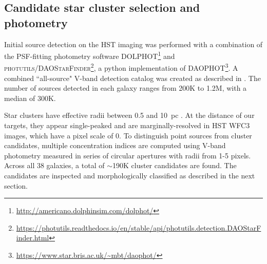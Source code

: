 \documentclass[linenumbers]{aastex63}
\begin{document}
\subsection{Candidate star cluster selection and photometry}\label{ssect:select_photo}

Initial source detection \citep{thilker_phangs-hst_2022} on the HST imaging was performed with a combination of the PSF-fitting photometry software \textsc{DOLPHOT}\footnote{\url{http://americano.dolphinsim.com/dolphot/}} \citep[v2.0,][]{dolphin_dolphot_2016} and \textsc{photutils/DAOStarFinder}\footnote{\url{https://photutils.readthedocs.io/en/stable/api/photutils.detection.DAOStarFinder.html}}\citep[][]{bradley_astropyphotutils_2023}, a python implementation of \textsc{DAOPHOT}\footnote{\url{https://www.star.bris.ac.uk/~mbt/daophot/}}\citep[v1.3-2][]{stetson_daophot_1987}. A combined ``all-source" V-band detection catalog was created as described in \citet{thilker_phangs-hst_2022}. The number of sources detected in each galaxy ranges from 200K to 1.2M, with a median of 300K.




Star clusters have effective radii between 0.5 and 10~pc \citep{portegies_zwart_young_2010,ryon_effective_2017,krumholz_star_2019,brown_radii_2021}. At the distance of our targets, they appear single-peaked and are marginally-resolved in HST WFC3 images, which have a pixel scale of 0.  To distinguish point sources from cluster candidates, multiple concentration indices \citep[MCI, ][]{thilker_phangs-hst_2022} are computed using V-band photometry measured in series of circular apertures with radii from 1-5 pixels.  Across all 38 galaxies, a total of $\sim$190K cluster candidates are found.  The candidates are inspected and morphologically classified as described in the next section.  
\end{document}

